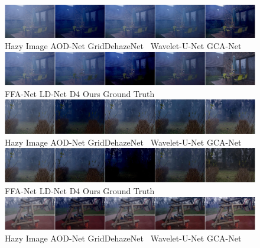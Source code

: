 \documentclass[lettersize,journal]{IEEEtran}
\begin{document}
\begin{figure}[ph!t]
    \centering
    \includegraphics[width=16.5cm]{ohaze_0_1.jpg} \\
    Hazy Image\qquad\quad\;\; AOD-Net\cite{li2017aod} \qquad GridDehazeNet\cite{liu2019griddehazenet} \;\, Wavelet-U-Net\cite{yang2019wavelet} \qquad GCA-Net\cite{chen2019gated}\\
    
    \includegraphics[width=16.5cm]{ohaze_0_2.jpg} \\ 
    FFA-Net\cite{qin2020ffa} \qquad\quad\; LD-Net\cite{ullah2021light} \qquad\qquad\; D4\cite{yang2022d4} \qquad\qquad\qquad\; Ours \qquad\qquad\quad Ground Truth \\
    
    \includegraphics[width=16.5cm]{ohaze_1_1.jpg} \\ 
    Hazy Image\qquad\quad\;\; AOD-Net\cite{li2017aod} \qquad GridDehazeNet\cite{liu2019griddehazenet} \;\, Wavelet-U-Net\cite{yang2019wavelet} \qquad GCA-Net\cite{chen2019gated}\\
    
    \includegraphics[width=16.5cm]{ohaze_1_2.jpg} \\ 
    FFA-Net\cite{qin2020ffa} \qquad\quad\; LD-Net\cite{ullah2021light} \qquad\qquad\; D4\cite{yang2022d4} \qquad\qquad\qquad\; Ours \qquad\qquad\quad Ground Truth \\
    
    \includegraphics[width=16.5cm]{ohaze_2_1.jpg} \\
    Hazy Image\qquad\quad\;\; AOD-Net\cite{li2017aod} \qquad GridDehazeNet\cite{liu2019griddehazenet} \;\, Wavelet-U-Net\cite{yang2019wavelet} \qquad GCA-Net\cite{chen2019gated}\\
    

\end{figure}
\end{document}
